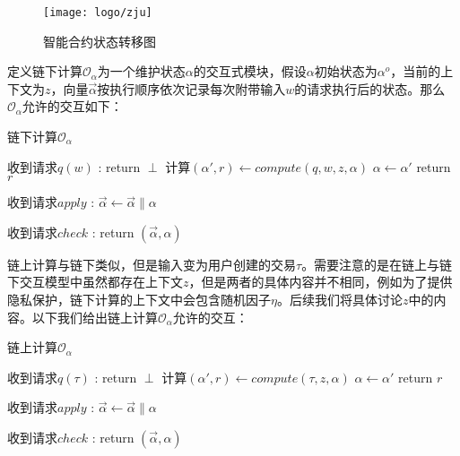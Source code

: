 \begin{figure}[htbp]
    \centering
    \texttt{[image: logo/zju]}
    \caption{\label{fig:ch3-transfer}智能合约状态转移图}
\end{figure}

定义链下计算$\mathcal{O}_{\alpha}$为一个维护状态$\alpha$的交互式模块，假设$\alpha$初始状态为$\alpha^o$，当前的上下文为$z$，向量$\vec{\alpha}$按执行顺序依次记录每次附带输入$w$的请求执行后的状态。那么$\mathcal{O}_{\alpha}$允许的交互如下：

\begin{breakablealgorithm}
    \caption{链下计算$\mathcal{O}_{\alpha}$}
    \label{alg:ch3-1}
    \begin{algorithmic} 
    \item [收到请求$q(w)$]:
    \IF {$\alpha = \perp$} 
    \STATE return $\perp$
    \ENDIF
    \STATE 计算$(\alpha', r) \leftarrow compute(q, w, z, \alpha)$
    \STATE $\alpha \leftarrow \alpha'$
    \STATE return $r$
    \item [收到请求$apply$]:
    \STATE $\vec{\alpha} \leftarrow \vec{\alpha} \parallel \alpha$
    \item [收到请求$check$]:
    \STATE return $(\vec{\alpha}, \alpha)$
    \end{algorithmic}
\end{breakablealgorithm}

链上计算与链下类似，但是输入变为用户创建的交易$\tau$。需要注意的是在链上与链下交互模型中虽然都存在上下文$z$，但是两者的具体内容并不相同，例如为了提供隐私保护，链下计算的上下文中会包含随机因子$\eta$。后续我们将具体讨论$z$中的内容。以下我们给出链上计算$\mathcal{O}_{\alpha}$允许的交互：

\begin{breakablealgorithm}
    \caption{链上计算$\mathcal{O}_{\alpha}$}
    \label{alg:ch3-2}
    \begin{algorithmic} 
        \setlength{\itemsep}{0pt}
        \setlength{\parsep}{0pt}
        \setlength{\parskip}{0pt}
        \item [收到请求$q(\tau)$]:
        \IF {$\alpha = \perp$}
        \STATE return $\perp$
        \ENDIF
        \STATE 计算$(\alpha', r) \leftarrow compute(\tau, z, \alpha)$
        \STATE $\alpha \leftarrow \alpha'$
        \STATE return $r$
        \item [收到请求$apply$]:
        \STATE $\vec{\alpha} \leftarrow \vec{\alpha} \parallel \alpha$
        \item [收到请求$check$]:
        \STATE return $(\vec{\alpha}, \alpha)$
    \end{algorithmic}
\end{breakablealgorithm}


